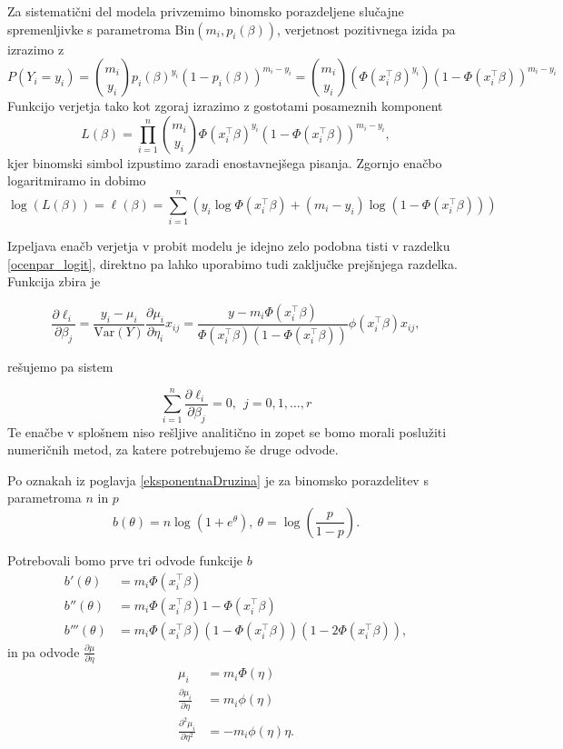 \documentclass[12pt,a4paper]{amsart}
\theoremstyle{definition} %
\theoremstyle{plain} %
\begin{document}
Za sistematični del modela privzemimo binomsko porazdeljene slučajne spremenljivke s parametroma $\mathrm{Bin}(m_{i},p_{i}(\beta))$,
verjetnost pozitivnega izida pa izrazimo z
\[
    P(Y_{i} = y_{i}) = \binom{m_{i}}{y_{i}}p_{i}(\beta)^{y_{i}}(1 - p_{i}(\beta))^{m_{i} - y_{i}} = \binom{m_{i}}{y_{i}} (\Phi(x_{i}^\top \beta)^{y_{i}})(1 - \Phi(x_{i}^\top \beta))^{m_{i} - y_{i}} 
\]
Funkcijo verjetja tako kot zgoraj izrazimo z gostotami posameznih komponent
\[
    L(\beta) = \prod_{i=1}^{n} \binom{m_{i}}{y_{i}} \Phi(x_{i}^\top\beta)^{y_{i}}(1 - \Phi(x_{i}^\top\beta))^{m_{i} - y_{i}},
\]
kjer binomski simbol izpustimo zaradi enostavnejšega pisanja. Zgornjo enačbo logaritmiramo in dobimo
\begin{equation}
    \log(L(\beta)) = \ell(\beta) = \sum_{i = 1}^{n}\left(y_{i}\log\Phi(x_{i}^\top\beta) + (m_{i} - y_{i})\log(1 - \Phi(x_{i}^\top\beta)) \right)
\end{equation}

Izpeljava enačb verjetja v probit modelu je idejno zelo podobna tisti v razdelku \ref{ocenpar_logit}, direktno pa lahko uporabimo tudi zaključke prejšnjega razdelka. Funkcija zbira je

\[
    \frac{\partial \ell_{i}}{\partial\beta_{j}} = \frac{y_{i} - \mu_{i}}{\mathrm{Var}(Y)}\frac{\partial\mu_{i}}{\partial\eta_{i}}x_{ij} = \frac{y-m_{i}\Phi(x_{i}^\top\beta)}{\Phi(x_{i}^\top\beta)(1-\Phi(x_{i}^\top\beta))}\phi(x_{i}^\top\beta)x_{ij},
\]

rešujemo pa sistem

\begin{equation}
    \sum_{i = 1}^{n}\frac{\partial \ell_{i}}{\partial\beta_{j}} = 0,~~j=0,1,\ldots,r
\end{equation}
Te enačbe v splošnem niso rešljive analitično in zopet se bomo morali poslužiti numeričnih metod, za katere potrebujemo še druge odvode.

Po oznakah iz poglavja \ref{eksponentnaDruzina} je za binomsko porazdelitev s parametroma $n$ in $p$
\[
    b(\theta) = n\log(1+e^{\theta}),~\theta = \log\left(\frac{p}{1-p}\right).
\]

Potrebovali bomo prve tri odvode funkcije $b$
\begin{align*}
    b'(\theta) &= m_{i}\Phi(x_{i}^\top\beta) \\
    b''(\theta) &= m_{i}\Phi(x_{i}^\top\beta)1-\Phi(x_{i}^\top\beta) \\
    b'''(\theta) &= m_{i}\Phi(x_{i}^\top\beta)(1-\Phi(x_{i}^\top\beta))(1-2\Phi(x_{i}^\top\beta)),
\end{align*}
in pa odvode $\tfrac{\partial\mu}{\partial\eta}$
\begin{align*}
    \mu_{i} &= m_{i}\Phi(\eta) \\
    \frac{\partial\mu_{i}}{\partial\eta} &= m_{i}\phi(\eta) \\
    \frac{\partial^2\mu_{i}}{\partial\eta^2} & = -m_{i}\phi(\eta)\eta.
\end{align*}
\end{document}
